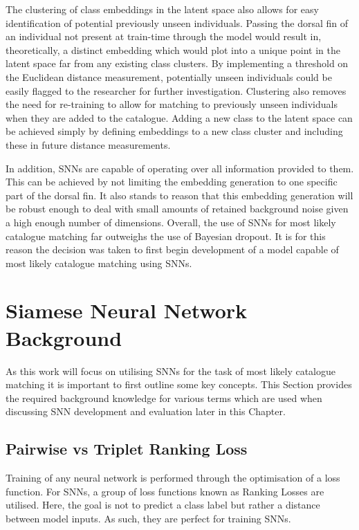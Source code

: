 The clustering of class embeddings in the latent space also allows for easy identification of potential previously unseen individuals. Passing the dorsal fin of an individual not present at train-time through the model would result in, theoretically, a distinct embedding which would plot into a unique point in the latent space far from any existing class clusters. By implementing a threshold on the Euclidean distance measurement, potentially unseen individuals could be easily flagged to the researcher for further investigation. Clustering also removes the need for re-training to allow for matching to previously unseen individuals when they are added to the catalogue. Adding a new class to the latent space can be achieved simply by defining embeddings to a new class cluster and including these in future distance measurements. 

In addition, SNNs are capable of operating over all information provided to them. This can be achieved by not limiting the embedding generation to one specific part of the dorsal fin. It also stands to reason that this embedding generation will be robust enough to deal with small amounts of retained background noise given a high enough number of dimensions. Overall, the use of SNNs for most likely catalogue matching far outweighs the use of Bayesian dropout. It is for this reason the decision was taken to first begin development of a model capable of most likely catalogue matching using SNNs.

\section{Siamese Neural Network Background}\label{ch:ID,sec:SNNBackground}

As this work will focus on utilising SNNs for the task of most likely catalogue matching it is important to first outline some key concepts. This Section provides the required background knowledge for various terms which are used when discussing SNN development and evaluation later in this Chapter.

\subsection{Pairwise vs Triplet Ranking Loss}\label{ch:ID,sec:SNNBackground,sub:lossFunction}

Training of any neural network is performed through the optimisation of a loss function. For SNNs, a group of loss functions known as Ranking Losses are utilised. Here, the goal is not to predict a class label but rather a distance between model inputs. As such, they are perfect for training SNNs. 

